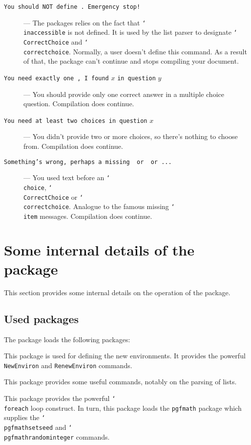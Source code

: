 \documentclass[12pt,a4paper]{exam}
\providecommand{\texorpdfstring}[2]{#1}
\newcommand{\bs}{\texorpdfstring{\char`\\}{}}
\begin{document}
\begin{description}
\item[\texttt{You should NOT define \string\inaccessible. Emergency stop!}] ---
The packages relies on the fact that \texttt{\bs inaccessible} is not defined. It is
used by the list parser to designate \texttt{\bs CorrectChoice} and
\texttt{\bs correctchoice}. Normally, a user doesn't define this command.
As a result of that, the package can't continue and stops compiling your document.

\item[\texttt{You need exactly one \string\CorrectChoice, I found} $x$
      \texttt{in question} $y$] --- You should provide only one correct
answer in a multiple choice question. Compilation does continue.

\item[\texttt{You need at least two choices in question} $x$] --- You didn't
provide two or more choices, so there's nothing to choose from. Compilation
does continue.     

\item[\texttt{Something's wrong, perhaps a missing \string\choice\ or \string\CorrectChoice\ or ...}] --- You used text before an \texttt{\bs choice}, \texttt{\bs CorrectChoice}
or \texttt{\bs correctchoice}. Analogue to the famous missing \texttt{\bs item} messages.
 Compilation does continue.
 
\end{description}



\section{Some internal details of the package}
This section provides some internal details on the operation of the package.

\subsection{Used packages}
The package loads the following packages:

\begin{description}[labelindent=2ex]
\item[\texttt{environ}] This package is used for defining the new environments. It provides
the powerful \texttt{NewEnviron} and \texttt{RenewEnviron} commands.
\item[\texttt{etoolbox}] This package provides some useful commands, notably on the parsing of lists.
\item[\texttt{pgffor}] This package provides the powerful \texttt{\bs foreach} loop
construct. In turn, this package loads the \texttt{pgfmath} package which supplies
the \texttt{\bs pgfmathsetseed} and \linebreak \texttt{\bs pgfmathrandominteger} commands.
\end{description}
\end{document}
